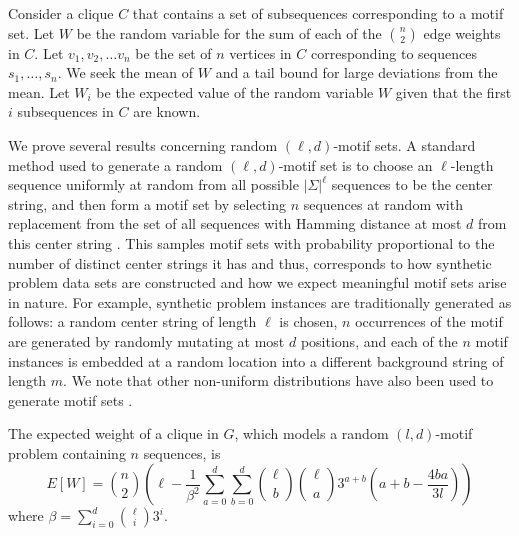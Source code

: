 Consider a clique $C$ that contains a set of subsequences corresponding to a motif set. Let $W$ be the random variable for the sum of each of the ${n \choose 2}$ edge weights in $C$. Let $v_1, v_2, \ldots v_n$ be the set of $n$ vertices in $C$ corresponding to sequences $s_1, \ldots, s_n$.  We seek the mean of $W$ and a tail bound for large deviations from the mean.  Let $W_i$ be the expected value of the random variable $W$ given that the first $i$ subsequences in $C$ are known.  

We prove several results concerning random $(\ell, d)$-motif sets.  A standard method used to generate a random $(\ell, d)$-motif set is to choose an $\ell$-length sequence uniformly at random from all possible $|\Sigma|^{\ell}$ sequences to be the center string, and then form a motif set by selecting $n$ sequences at random with replacement from the set of all sequences with Hamming distance at most $d$ from this center string \cite{BT02}.  This samples motif sets with probability proportional to the number of distinct center strings it has and thus, corresponds to how synthetic problem data sets are constructed and how we expect meaningful motif sets arise in nature.  For example, synthetic problem instances are traditionally generated as follows: a random center string of length $\ell$ is chosen, $n$ occurrences of the motif are generated by randomly mutating at most $d$ positions, and each of the $n$ motif instances is embedded at a random location into a different background string of length $m$.  We note that other non-uniform distributions have also been used to generate motif sets \cite{PS00}. 

\begin{theorem}  \label{mean_thm} The expected weight of a clique in $G$, which models a random $(l,d)$-motif problem containing $n$ sequences, is  \[ E[W] = {n \choose 2} \left( \ell -  \frac{1}{\beta^2}  \sum_{a=0}^{d} \sum_{b=0}^{d}{{\ell} \choose b}{{\ell} \choose a}3^{a + b} \left(  a+b-\frac{4ba}{3l}\right) \right) \] where $\beta= \sum_{i = 0}^{d} {{\ell} \choose i} 3^i$. \end{theorem}

